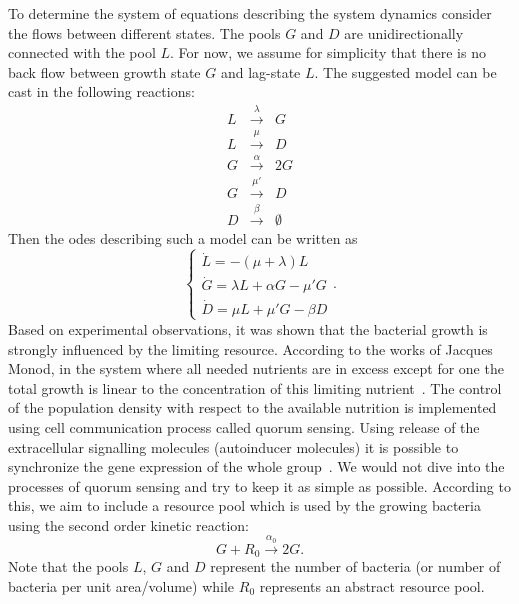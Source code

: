 \documentclass[10pt,A4paper]{article}
\numberwithin{equation}{section}
\begin{document}
To determine the system of equations describing the system dynamics consider the flows between different states.
The pools $G$ and $D$ are unidirectionally connected with the pool $L$.
For now, we assume for simplicity that there is no back flow between growth state $G$ and lag-state $L$.
The suggested model can be cast in the following reactions:
\begin{eqnarray}
    L &\stackrel{\lambda}{\longrightarrow} & G\\
    L &\stackrel{\mu}{\longrightarrow} & D\\
    G &\stackrel{\alpha}{\longrightarrow} & 2G\\
    G &\stackrel{\mu'}{\longrightarrow} & D\\
    D &\stackrel{\beta}{\longrightarrow} & \emptyset
\label{eq:reactions_3pools}
\end{eqnarray}
Then the \acp{ode} describing such a model can be written as
\begin{equation}
\begin{cases}
    \dot{L} = -(\mu + \lambda) L\\
    \dot{G} = \lambda L + \alpha G - \mu' G\\
    \dot{D} = \mu  L + \mu' G- \beta D  
\end{cases}.
\label{eq:ode_3pools}
\end{equation}
%
Based on experimental observations, it was shown that the bacterial growth is strongly influenced by the limiting resource.
According to the works of Jacques Monod, in the system where all needed nutrients are in excess except for one the total growth is linear to the concentration of this limiting nutrient~\cite{monod_growth_1949}.
The control of the population density with respect to the available nutrition is implemented using cell communication process called quorum sensing.
Using release of the extracellular signalling molecules (autoinducer molecules) it is possible to synchronize the gene expression of the whole group~\cite{ng_bacterial_2009}.
We would not dive into the processes of quorum sensing and try to keep it as simple as possible.
According to this, we aim to include a resource pool which is used by the growing bacteria using the second order kinetic reaction:
\begin{equation}
    G + R_0  \stackrel{\alpha_0}{\longrightarrow} 2G.
\label{eq:reactions_resource}
\end{equation}
Note that the pools $L$, $G$ and $D$ represent the number of bacteria (or number of bacteria per unit area/volume) while $R_0$ represents an abstract resource pool.
\end{document}
